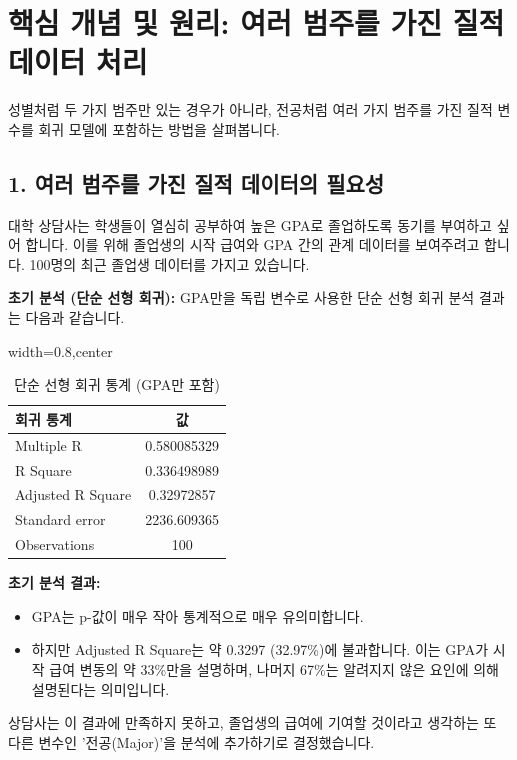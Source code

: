 \documentclass[11pt,a4paper]{article}
\begin{document}
\newpage
\section*{핵심 개념 및 원리: 여러 범주를 가진 질적 데이터 처리}
성별처럼 두 가지 범주만 있는 경우가 아니라, 전공처럼 여러 가지 범주를 가진 질적 변수를 회귀 모델에 포함하는 방법을 살펴봅니다.

\subsection*{1. 여러 범주를 가진 질적 데이터의 필요성}
대학 상담사는 학생들이 열심히 공부하여 높은 GPA로 졸업하도록 동기를 부여하고 싶어 합니다. 이를 위해 졸업생의 시작 급여와 GPA 간의 관계 데이터를 보여주려고 합니다. 100명의 최근 졸업생 데이터를 가지고 있습니다.

\textbf{초기 분석 (단순 선형 회귀):}
GPA만을 독립 변수로 사용한 단순 선형 회귀 분석 결과는 다음과 같습니다.

\begin{table}[htbp]
\centering
\caption{단순 선형 회귀 통계 (GPA만 포함)}
\label{tab:simple_reg_gpa}
\begin{adjustbox}{width=0.8\textwidth,center}
\begin{tabular}{lc}
\toprule
\textbf{회귀 통계} & \textbf{값} \\
\midrule
Multiple R & 0.580085329 \\
R Square & 0.336498989 \\
Adjusted R Square & 0.32972857 \\
Standard error & 2236.609365 \\
Observations & 100 \\
\bottomrule
\end{tabular}
\end{adjustbox}
\end{table}

\begin{summarybox}
\textbf{초기 분석 결과:}
\begin{itemize}
    \item GPA는 p-값이 매우 작아 통계적으로 매우 유의미합니다.
    \item 하지만 Adjusted R Square는 약 0.3297 (32.97\%)에 불과합니다. 이는 GPA가 시작 급여 변동의 약 33\%만을 설명하며, 나머지 67\%는 알려지지 않은 요인에 의해 설명된다는 의미입니다.
\end{itemize}
상담사는 이 결과에 만족하지 못하고, 졸업생의 급여에 기여할 것이라고 생각하는 또 다른 변수인 '전공(Major)'을 분석에 추가하기로 결정했습니다.
\end{summarybox}
\end{document}
